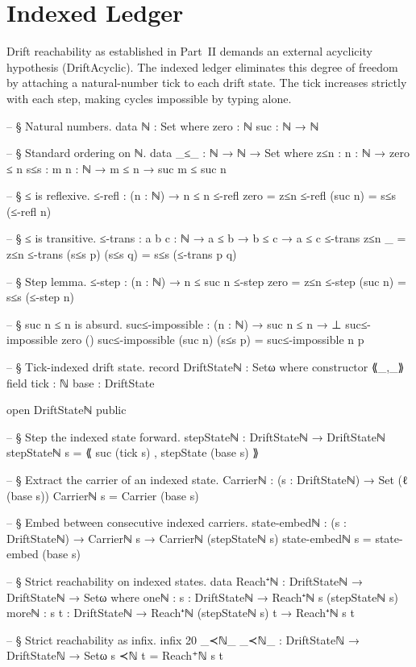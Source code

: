 \documentclass[11pt,a4paper]{book}
\def\texttt#1{#1}%
\begin{document}
\chapter{Indexed Ledger}

Drift reachability as established in Part~II demands an external acyclicity hypothesis (\texttt{DriftAcyclic}). The indexed ledger eliminates this degree of freedom by attaching a natural-number tick to each drift state. The tick increases strictly with each step, making cycles impossible by typing alone.

\begin{code}
-- § Natural numbers.
data ℕ : Set where
  zero : ℕ
  suc  : ℕ → ℕ

-- § Standard ordering on ℕ.
data _≤_ : ℕ → ℕ → Set where
  z≤n : {n : ℕ} → zero ≤ n
  s≤s : {m n : ℕ} → m ≤ n → suc m ≤ suc n

-- § ≤ is reflexive.
≤-refl : (n : ℕ) → n ≤ n
≤-refl zero    = z≤n
≤-refl (suc n) = s≤s (≤-refl n)

-- § ≤ is transitive.
≤-trans : {a b c : ℕ} → a ≤ b → b ≤ c → a ≤ c
≤-trans z≤n       _          = z≤n
≤-trans (s≤s p) (s≤s q) = s≤s (≤-trans p q)

-- § Step lemma.
≤-step : (n : ℕ) → n ≤ suc n
≤-step zero    = z≤n
≤-step (suc n) = s≤s (≤-step n)

-- § suc n ≤ n is absurd.
suc≤-impossible : (n : ℕ) → suc n ≤ n → ⊥
suc≤-impossible zero ()
suc≤-impossible (suc n) (s≤s p) = suc≤-impossible n p

-- § Tick-indexed drift state.
record DriftStateℕ : Setω where
  constructor ⟪_,_⟫
  field
    tick : ℕ
    base : DriftState

open DriftStateℕ public

-- § Step the indexed state forward.
stepStateℕ : DriftStateℕ → DriftStateℕ
stepStateℕ s = ⟪ suc (tick s) , stepState (base s) ⟫

-- § Extract the carrier of an indexed state.
Carrierℕ : (s : DriftStateℕ) → Set (ℓ (base s))
Carrierℕ s = Carrier (base s)

-- § Embed between consecutive indexed carriers.
state-embedℕ : (s : DriftStateℕ) → Carrierℕ s → Carrierℕ (stepStateℕ s)
state-embedℕ s = state-embed (base s)

-- § Strict reachability on indexed states.
data Reach⁺ℕ : DriftStateℕ → DriftStateℕ → Setω where
  oneℕ  : {s : DriftStateℕ} → Reach⁺ℕ s (stepStateℕ s)
  moreℕ : {s t : DriftStateℕ} → Reach⁺ℕ (stepStateℕ s) t → Reach⁺ℕ s t

-- § Strict reachability as infix.
infix 20 _≺ℕ_
_≺ℕ_ : DriftStateℕ → DriftStateℕ → Setω
s ≺ℕ t = Reach⁺ℕ s t
\end{code}
\end{document}
